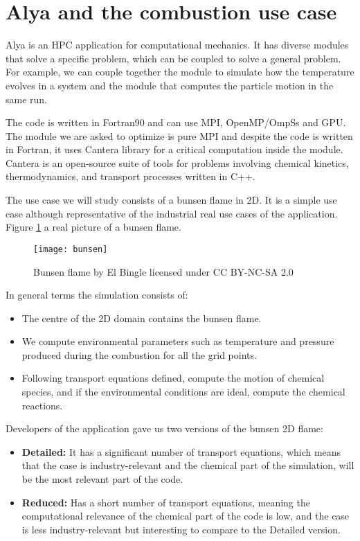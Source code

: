 \section{Alya and the combustion use case}
Alya is an HPC application for computational mechanics. It has diverse modules that solve a specific problem, which can be coupled to solve a general problem. For example, we can couple together the module to simulate how the temperature evolves in a system and the module that computes the particle motion in the same run. 

The code is written in Fortran90 and can use MPI, OpenMP/OmpSs and GPU. The module we are asked to optimize is pure MPI and despite the code is written in Fortran, it uses Cantera library for a critical computation inside the module. Cantera\cite{cantera} is an open-source suite of tools for problems involving chemical kinetics, thermodynamics, and transport processes written in C++.

The use case we will study consists of a bunsen flame in 2D. It is a simple use case although representative of the industrial real use cases of the application. Figure \ref{bunsen} a real picture of a bunsen flame. 

\begin{figure}[h]
  \centering
  \texttt{[image: bunsen]}
  \caption[Bunsen flame]{Bunsen flame by El Bingle licensed under CC BY-NC-SA 2.0}
  \label{bunsen}
\end{figure}
  

In general terms the simulation consists of:
\begin{itemize}
  \item The centre of the 2D domain contains the bunsen flame.
  \item We compute environmental parameters such as temperature and pressure produced during the combustion for all the grid points.
  \item Following transport equations defined, compute the motion of chemical species, and if the environmental conditions are ideal, compute the chemical reactions.
\end{itemize}

Developers of the application gave us two versions of the bunsen 2D flame:

\begin{itemize}
  \item \textbf{Detailed:} It has a significant number of transport equations, which means that the case is industry-relevant and the chemical part of the simulation, will be the most relevant part of the code.

  \item \textbf{Reduced:} Has a short number of transport equations, meaning the computational relevance of the chemical part of the code is low, and the case is less industry-relevant but interesting to compare to the Detailed version.
\end{itemize}

